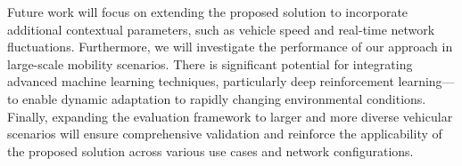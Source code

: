 \documentclass[iicol]{sn-jnl}
\begin{document}
Future work will focus on extending the proposed solution to incorporate additional contextual parameters, such as vehicle speed and real-time network fluctuations. Furthermore, we will investigate the performance of our approach in large-scale mobility scenarios. There is significant potential for integrating advanced machine learning techniques, particularly deep reinforcement learning—to enable dynamic adaptation to rapidly changing environmental conditions. Finally, expanding the evaluation framework to larger and more diverse vehicular scenarios will ensure comprehensive validation and reinforce the applicability of the proposed solution across various use cases and network configurations.




\end{document}
